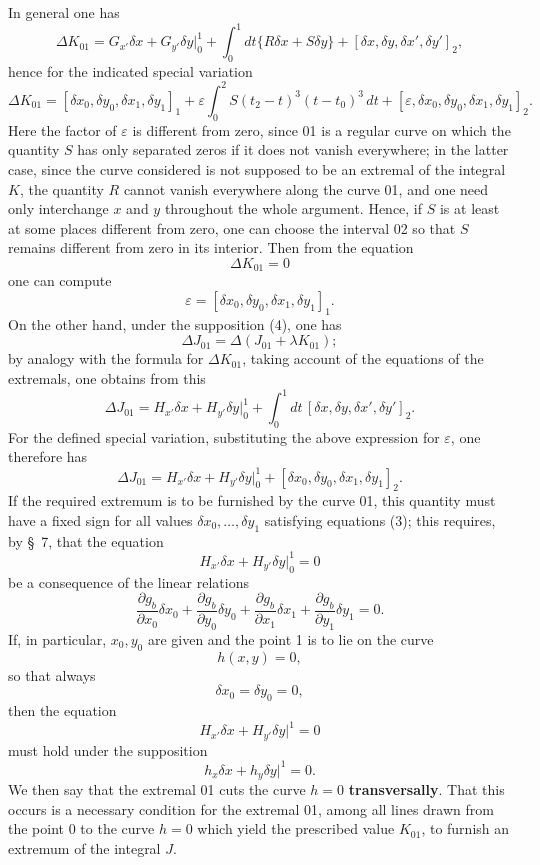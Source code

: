 \documentclass[11pt,a4paper,leqno]{article}
\begin{document}
In general one has
\[
\Delta K_{01}=G_{x'}\delta x+G_{y'}\delta y\bigg|_0^1+
\int_0^1dt\{R\delta x+S\delta y\}
+[\delta x,\delta y,\delta x',\delta y']_2,
\]
hence for the indicated special variation
\[
\Delta K_{01}=[\delta x_0,\delta y_0,\delta x_1,\delta y_1]_1+
\varepsilon\int_0^2S(t_2-t)^3(t-t_0)^3\,dt
+[\varepsilon,\delta x_0,\delta y_0,\delta x_1,\delta y_1]_2.
\]
Here the factor of $\varepsilon$ is different from zero, since 01 is a regular curve on which the quantity $S$ has only separated zeros if it does not vanish everywhere; in the latter case, since the curve considered is not supposed to be an extremal of the integral $K$, the quantity $R$ cannot vanish everywhere along the curve 01, and one need only interchange $x$ and $y$ throughout the whole argument. Hence, if $S$ is at least at some places different from zero, one can choose the interval 02 so that $S$ remains different from zero in its interior. Then from the equation
\begin{equation}\tag{4}
\Delta K_{01}=0
\end{equation}
one can compute
\[
\varepsilon=[\delta x_0,\delta y_0,\delta x_1,\delta y_1]_1.
\]
On the other hand, under the supposition (4), one has
\[
\Delta J_{01}=\Delta(J_{01}+\lambda K_{01});
\]
by analogy with the formula for $\Delta K_{01}$, taking account of the equations of the extremals, one obtains from this
\[
\Delta J_{01}=H_{x'}\delta x+H_{y'}\delta y\bigg|_0^1+
\int_0^1dt\,[\delta x,\delta y,\delta x',\delta y']_2.
\]
For the defined special variation, substituting the above expression for $\varepsilon$, one therefore has
\[
\Delta J_{01}=H_{x'}\delta x+H_{y'}\delta y\bigg|_0^1+
[\delta x_0,\delta y_0,\delta x_1,\delta y_1]_2.
\]
If the required extremum is to be furnished by the curve 01, this quantity must have a fixed sign for all values $\delta x_0,\ldots,\delta y_1$ satisfying equations (3); this requires, by \S~7, that the equation
\[
H_{x'}\delta x+H_{y'}\delta y\bigg|_0^1=0
\]
be a consequence of the linear relations
\[
\frac{\partial g_b}{\partial x_0}\delta x_0+
\frac{\partial g_b}{\partial y_0}\delta y_0+
\frac{\partial g_b}{\partial x_1}\delta x_1+
\frac{\partial g_b}{\partial y_1}\delta y_1=0.
\]
If, in particular, $x_0,y_0$ are given and the point 1 is to lie on the curve
\[
h(x,y)=0,
\]
so that always
\[
\delta x_0=\delta y_0=0,
\]
then the equation
\[
H_{x'}\delta x+H_{y'}\delta y\bigg|^1=0
\]
must hold under the supposition
\[
h_x\delta x+h_y\delta y\bigg|^1=0.
\]
We then say that the extremal 01 cuts the curve $h=0$ \textbf{transversally}. That this occurs is a necessary condition for the extremal 01, among all lines drawn from the point 0 to the curve $h=0$ which yield the prescribed value $K_{01}$, to furnish an extremum of the integral $J$.
\end{document}
